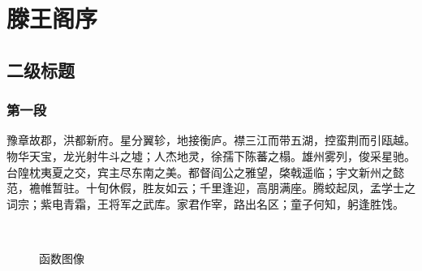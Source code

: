 
\section{滕王阁序}
\subsection{二级标题}
\subsubsection{第一段}

豫章故郡，洪都新府。星分翼轸，地接衡庐。襟三江而带五湖，控蛮荆而引瓯越。物华天宝，龙光射牛斗之墟；人杰地灵，徐孺下陈蕃之榻。雄州雾列，俊采星驰。台隍枕夷夏之交，宾主尽东南之美。都督阎公之雅望，棨戟遥临；宇文新州之懿范，襜帷暂驻。十旬休假，胜友如云；千里逢迎，高朋满座。腾蛟起凤，孟学士之词宗；紫电青霜，王将军之武库。家君作宰，路出名区；童子何知，躬逢胜饯。

\begin{figure}[htb]
    \centering
    \;
    \\
    \;

    \caption{函数图像}
    \label{fig:test}
\end{figure}

